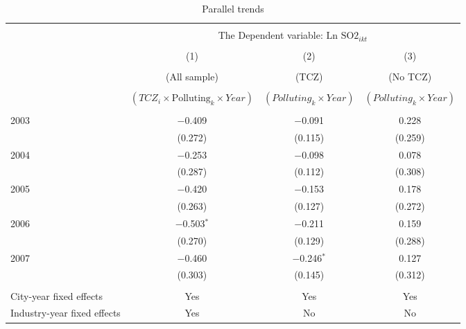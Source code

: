 \documentclass[12pt]{article}
\begin{document}
\begin{table}[!htb] \centering
  \caption{Parallel trends}
  \begin{adjustbox}{width=\textwidth, totalheight=\baselineskip,keepaspectratio}
    \label{tab:table4}
    \begin{tabular}{@{\extracolsep{5pt}}lccc}
      \\[-1.8ex]\hline
      \hline \\[-1.8ex]
      & \multicolumn{3}{c}{The Dependent variable: $\text{Ln SO2}_{ikt}$} \\
      \cline{2-4}
      \\[-1.8ex] & (1) & (2) & (3)\\
      \\[-1.8ex] & (All sample) & (TCZ) & (No TCZ)\\
      \\[-1.8ex] & $(TCZ_i \times \text{Polluting}_k \times Year)$ & $(Polluting_k \times Year)$ & $(Polluting_k \times Year)$\\
      \hline \\[-1.8ex]
      2003                        & $-$0.409       & $-$0.091       & 0.228   \\
                                  & (0.272)        & (0.115)        & (0.259) \\
      2004                        & $-$0.253       & $-$0.098       & 0.078   \\
                                  & (0.287)        & (0.112)        & (0.308) \\
      2005                        & $-$0.420       & $-$0.153       & 0.178   \\
                                  & (0.263)        & (0.127)        & (0.272) \\
      2006                        & $-$0.503$^{*}$ & $-$0.211       & 0.159   \\
                                  & (0.270)        & (0.129)        & (0.288) \\
      2007                        & $-$0.460       & $-$0.246$^{*}$ & 0.127   \\
                                  & (0.303)        & (0.145)        & (0.312) \\
      \hline \\[-1.8ex]
      City-year fixed effects     & Yes            & Yes            & Yes     \\
      Industry-year fixed effects & Yes            & No             & No      \\

\end{tabular}
\end{adjustbox}
\end{table}
\end{document}
